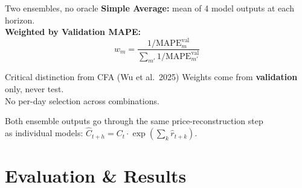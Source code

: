 \documentclass[aspectratio=169]{beamer}
\begin{document}
\begin{frame}{Two ensembles, no oracle}
\textbf{Simple Average:} mean of 4 model outputs at each horizon.
\vspace{0.3cm}
\\ \textbf{Weighted by Validation MAPE:}
\begin{equation*}
w_m = \frac{1/\mathrm{MAPE}_m^{\mathrm{val}}}{\sum_{m'} 1/\mathrm{MAPE}_{m'}^{\mathrm{val}}}
\end{equation*}

\vspace{0.4cm}
\begin{block}{Critical distinction from CFA (Wu et al.\ 2025)}
Weights come from \textbf{validation} only, never test.\\
No per-day selection across combinations.
\end{block}

\vspace{0.3cm}
\centering
\small Both ensemble outputs go through the same price-reconstruction step\\ as individual models: $\hat{C}_{t+h} = C_t \cdot \exp(\sum_k \hat{r}_{t+k})$.
\end{frame}


\section{Evaluation \& Results}
\end{document}
